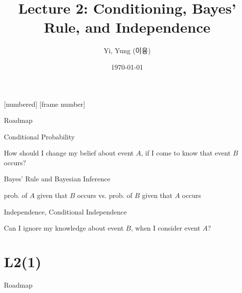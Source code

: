 


\csname\pdfmode\endcsname

{
  [numbered]
  [frame number]  %
} 



\title[]{Lecture 2: Conditioning, Bayes' Rule, and Independence }
\author{Yi, Yung (이융)}
\date{\today}








\begin{frame}
  \titlepage
\end{frame}


\begin{frame}{Roadmap}

\plitemsep 0.2in

\bce[(1)]
\item Conditional Probability
\bci
\item How should I change my belief about event $A$, if I come to know that event $B$ occurs?
\eci


\item Bayes' Rule and Bayesian Inference
\bci
\item prob. of $A$ given that $B$ occurs vs. prob. of $B$ given that $A$ occurs

\eci


\item Independence, Conditional Independence
\bci
\item Can I ignore my knowledge about event $B$, when I consider event $A$? 
\eci

\ece
\end{frame}

\section{L2(1)}
\begin{frame}{Roadmap}



\bce[(1)]
\item {}

\item {}

\ece
\end{frame}

